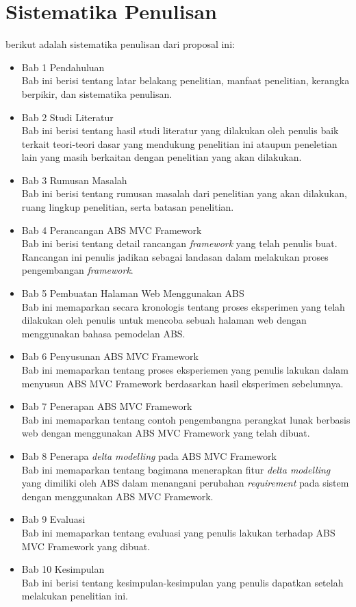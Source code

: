\section{Sistematika Penulisan}
berikut adalah sistematika penulisan dari proposal ini:
\begin{itemize}
    \item Bab 1 Pendahuluan \\
    Bab ini berisi tentang latar belakang penelitian, manfaat penelitian, kerangka berpikir, dan sistematika penulisan.
    \item Bab 2 Studi Literatur \\
    Bab ini berisi tentang hasil studi literatur yang dilakukan oleh penulis baik terkait teori-teori dasar yang mendukung penelitian ini ataupun peneletian lain yang masih berkaitan dengan penelitian yang akan dilakukan.
    \item Bab 3 Rumusan Masalah \\
    Bab ini berisi tentang rumusan masalah dari penelitian yang akan dilakukan, ruang lingkup penelitian, serta batasan penelitian.
    \item Bab 4 Perancangan ABS MVC Framework \\
    Bab ini berisi tentang detail rancangan \textit{framework} yang telah penulis buat. Rancangan ini penulis jadikan sebagai landasan dalam melakukan proses pengembangan \textit{framework}.
    \item Bab 5 Pembuatan Halaman Web Menggunakan ABS \\
    Bab ini memaparkan secara kronologis tentang proses eksperimen yang telah dilakukan oleh penulis untuk mencoba sebuah halaman web dengan menggunakan bahasa pemodelan ABS.
    \item Bab 6 Penyusunan ABS MVC Framework \\
    Bab ini memaparkan tentang proses eksperiemen yang penulis lakukan dalam menyusun ABS MVC Framework berdasarkan hasil eksperimen sebelumnya.
    \item Bab 7 Penerapan ABS MVC Framework \\
    Bab ini memaparkan tentang contoh pengembangna perangkat lunak berbasis web dengan menggunakan ABS MVC Framework yang telah dibuat.
    \item Bab 8 Penerapa \textit{delta modelling} pada ABS MVC Framework \\
    Bab ini memaparkan tentang bagimana menerapkan fitur \textit{delta modelling} yang dimiliki oleh ABS dalam menangani perubahan \textit{requirement} pada sistem dengan menggunakan ABS MVC Framework.
    \item Bab 9 Evaluasi \\
    Bab ini memaparkan tentang evaluasi yang penulis lakukan terhadap ABS MVC Framework yang dibuat.
    \item Bab 10 Kesimpulan \\
    Bab ini berisi tentang kesimpulan-kesimpulan yang penulis dapatkan setelah melakukan penelitian ini.
\end{itemize}
